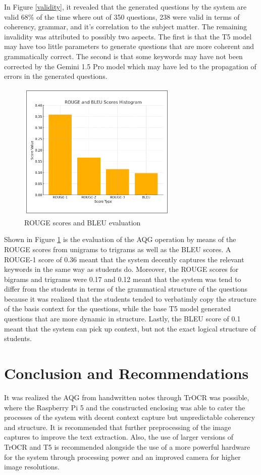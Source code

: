 \documentclass[conference]{IEEEtran}
\begin{document}
\indent In Figure \ref{validity}, it revealed that the generated questions 
by the system are valid 68\% of the time where out of 350 questions, 
238 were valid in terms of coherency, grammar, and it's correlation 
to the subject matter. The remaining invalidity was attributed to 
possibly two aspects. The first is that the T5 model may have too little 
parameters to generate questions that are more coherent and 
grammatically correct. The second is that some keywords may have not been 
corrected by the Gemini 1.5 Pro model which may have led to the
propagation of errors in the generated questions.
\begin{figure}[H]
    \centerline{\includegraphics[width=3in]{eval.png}}
    \vspace{-0.5cm}
    \caption{ROUGE scores and BLEU evaluation} 
    \label{eval}
    \end{figure}
Shown in Figure \ref{eval} is the evaluation of the AQG operation by means
of the ROUGE scores from unigrams to trigrams as well as the BLEU scores. 
A ROUGE-1 score of 0.36 meant that the system decently captures 
the relevant keywords in the same way as students do. 
Moreover, the ROUGE scores for bigrams and trigrams were 0.17
and 0.12 meant that the system was tend to differ from the 
students in terms of the grammatical structure of the questions
because it was realized that the students tended to verbatimly copy 
the structure of the basis context for the questions, while the 
base T5 model generated questions that are more 
dynamic in structure. Lastly, the BLEU score of 0.1 meant that 
the system can pick up context, but not the exact logical structure 
of students.

\section{Conclusion and Recommendations}
\indent It was realized the AQG from handwritten notes 
through TrOCR was possible, where the Raspberry Pi 5 
and the constructed enclosing
was able to cater the processes of the system with 
decent context capture but unpredictable coherency and 
structure. It is recommended that further preprocessing of the image 
captures to improve the text extraction. Also, 
the use of larger versions of TrOCR and T5 is recommended 
alongside the use of a more powerful hardware for the system
through processing power and an improved camera for 
higher image resolutions.
\end{document}
